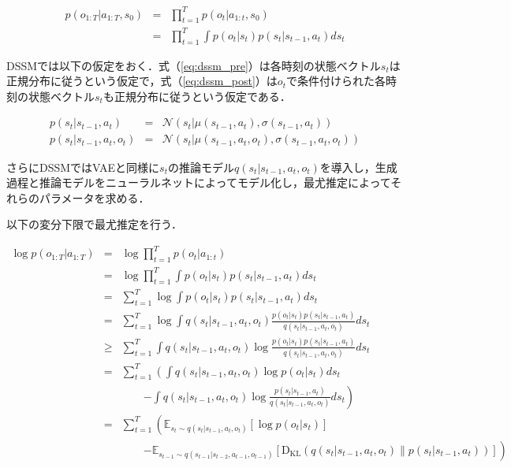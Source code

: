 \begin{eqnarray}
  p(o_{1:T}|a_{1:T}, s_0)
  &=& \prod_{t=1}^T p(o_t|a_{1:t}, s_0) \nonumber \\
  &=& \prod_{t=1}^T \int p(o_t|s_t) p(s_t|s_{t-1}, a_t)ds_t \label{eq:dssm}
\end{eqnarray}

DSSMでは以下の仮定をおく．式（\ref{eq:dssm_pre}）は各時刻の状態ベクトル$s_t$は正規分布に従うという仮定で，式（\ref{eq:dssm_post}）は$o_t$で条件付けられた各時刻の状態ベクトル$s_t$も正規分布に従うという仮定である．

\begin{eqnarray}
  p(s_t|s_{t-1}, a_t) &=& \mathcal{N}(s_t|\mu(s_{t-1}, a_t),\sigma(s_{t-1}, a_t))\label{eq:dssm_pre} \\
  p(s_t|s_{t-1}, a_t, o_t) &=& \mathcal{N}(s_t|\mu(s_{t-1}, a_t, o_t),\sigma(s_{t-1}, a_t, o_t))\label{eq:dssm_post}
\end{eqnarray}

さらにDSSMではVAEと同様に$s_t$の推論モデル$q(s_t|s_{t-1}, a_t, o_t)$を導入し，生成過程と推論モデルをニューラルネットによってモデル化し，最尤推定によってそれらのパラメータを求める．

以下の変分下限で最尤推定を行う．

\begin{eqnarray}
  \log p(o_{1:T}|a_{1:T})
  &=& \log \prod_{t=1}^T p(o_t|a_{1:t}) \nonumber \\
  &=& \log \prod_{t=1}^T \int p(o_t|s_t) p(s_t|s_{t-1}, a_t)ds_t \nonumber \\
  &=& \sum_{t=1}^T \log \int p(o_t|s_t) p(s_t|s_{t-1}, a_t)ds_t \nonumber \\
  &=& \sum_{t=1}^T \log \int q(s_t|s_{t-1}, a_t, o_t) \frac{p(o_t|s_t) p(s_t|s_{t-1}, a_t)}{q(s_t|s_{t-1}, a_t, o_t)}ds_t \label{eq:dssm_replace} \\
  &\geq& \sum_{t=1}^T \int q(s_t|s_{t-1}, a_t, o_t) \log \frac{p(o_t|s_t) p(s_t|s_{t-1}, a_t)}{q(s_t|s_{t-1}, a_t, o_t)}ds_t \label{eq:dssm_jensen} \\
  &=& \sum_{t=1}^T \left( \int q(s_t|s_{t-1}, a_t, o_t) \log p(o_t|s_t)ds_t \right. \nonumber \\
  && \hspace{2em} \left. - \int q(s_t|s_{t-1}, a_t, o_t) \log \frac{p(s_t|s_{t-1}, a_t)}{q(s_t|s_{t-1}, a_t, o_t)}ds_t \right) \nonumber \\
  &=& \sum_{t=1}^T \left( \mathbb{E}_{s_t \sim q(s_t|s_{t-1}, a_t, o_t)} [\log p(o_t|s_t)] \right. \nonumber \\
  && \hspace{2em} \left. - \mathbb{E}_{s_{t-1} \sim q(s_{t-1}|s_{t-2}, a_{t-1}, o_{t-1})} [\mathrm{D_{KL}}(q(s_t|s_{t-1}, a_t, o_t) \| p(s_t|s_{t-1}, a_t))] \right) \nonumber \\
  \label{eq:dssm_elbo}  
\end{eqnarray}

